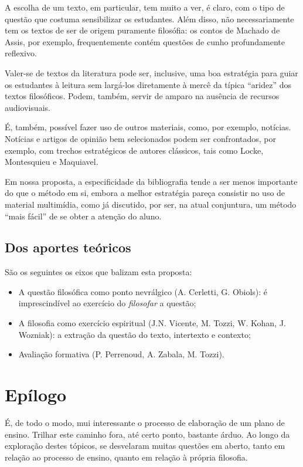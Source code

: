 \documentclass[12pt,a4paper]{article}
\begin{document}
	A escolha de um texto, em particular, tem muito a ver, é claro, 
	com o tipo de questão que costuma sensibilizar os estudantes. 
	Além disso, não necessariamente tem os textos de ser de origem 
	puramente filosófia: os contos de Machado de Assis, por exemplo, 
	frequentemente contém questões de cunho profundamente reflexivo. 

	Valer-se de textos da literatura pode ser, inclusive, uma boa 
	estratégia para guiar os estudantes à leitura sem largá-los 
	diretamente à mercê da típica “aridez” dos textos filosóficos. 
	Podem, também, servir de amparo na ausência de recursos 
	audiovisuais. 

	É, também, possível fazer uso de outros materiais, como, por exemplo, 
	notícias. Notícias e artigos de opinião bem selecionados podem ser 
	confrontados, por exemplo, com trechos estratégicos de autores 
	clássicos, tais como Locke, Montesquieu e Maquiavel. 

	Em nossa proposta, a especificidade da bibliografia tende a ser 
	menos importante do que o método em si, embora a melhor estratégia 
	pareça consistir no uso de material multimídia, como já discutido, 
	por ser, na atual conjuntura, um método “mais fácil” de se obter 
	a atenção do aluno. 

	\subsection{Dos aportes teóricos}

	São os seguintes os eixos que balizam esta proposta: 
	
	\begin{itemize}
		\item A questão filosófica como ponto nevrálgico (A. Cerletti, 
		G. Obiols): é imprescindível ao exercício do \emph{filosofar} 
		a questão; 
		\item A filosofia como exercício espiritual (J.N. Vicente, 
		M. Tozzi, W. Kohan, J. Wozniak): a extração da questão do 
		texto, intertexto e contexto; 
		\item Avaliação formativa (P. Perrenoud, A. Zabala, M. Tozzi).  
	\end{itemize}

	\newpage

	\section{Epílogo}
	
	É, de todo o modo, mui interessante o processo de elaboração de um 
	plano de ensino. Trilhar este caminho fora, até certo ponto, bastante 
	árduo. Ao longo da exploração destes tópicos, se desvelaram muitas 
	questões em aberto, tanto em relação ao processo de ensino, quanto em 
	relação à própria filosofia. 
\end{document}
